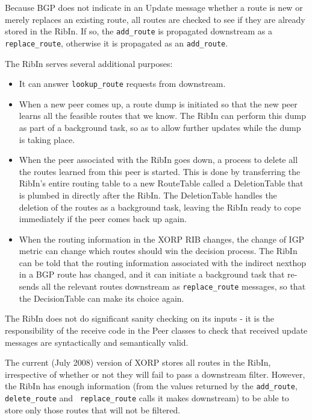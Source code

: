 \documentclass[11pt]{article}
\begin{document}
Because BGP does not indicate in an Update message whether a route is
new or merely replaces an existing route, all routes are checked to
see if they are already stored in the RibIn.  If so, the {\tt add\_route} is
propagated downstream as a {\tt replace\_route}, otherwise it is propagated
as an {\tt add\_route}.

The RibIn serves several additional purposes:

\begin{itemize}

  \item It can answer {\tt lookup\_route} requests from downstream.

  \item When a new peer comes up, a route dump is initiated so that the
  new peer learns all the feasible routes that we know.  The RibIn
  can perform this dump as part of a background task, so as to
  allow further updates while the dump is taking place.

  \item When the peer associated with the RibIn goes down, a process to
  delete all the routes learned from this peer is started.  This
  is done by transferring the RibIn's entire routing table to a
  new RouteTable called a DeletionTable that is plumbed in
  directly after the RibIn. The DeletionTable handles the deletion
  of the routes as a background task, leaving the RibIn ready to
  cope immediately if the peer comes back up again.

  \item When the routing information in the XORP RIB changes, the change
  of IGP metric can change which routes should win the decision
  process.
  The RibIn can be told that the routing information associated
  with the indirect nexthop in a BGP route has changed, and it can
  initiate a background task that re-sends all the relevant routes
  downstream as {\tt replace\_route} messages, so that the
  DecisionTable can make its choice again.

\end{itemize}

The RibIn does not do significant sanity checking on its inputs - it
is the responsibility of the receive code in the Peer classes to check
that received update messages are syntactically and semantically
valid.

The current (July 2008) version of XORP stores all routes in the RibIn,
irrespective of whether or not they will fail to pass a downstream
filter.  However, the RibIn has enough information (from the values
returned by the {\tt add\_route}, {\tt delete\_route} and {\tt
replace\_route} calls it makes downstream) to be able to store only
those routes that will not be filtered.
\end{document}

